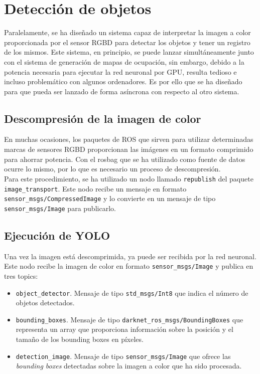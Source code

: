\section{Detección de objetos}

Paralelamente, se ha diseñado un sistema capaz de interpretar la imagen a color proporcionada por el sensor RGBD para detectar los objetos y tener un registro de los mismos. Este sistema, en principio, se puede lanzar simultáneamente junto con el sistema de generación de mapas de ocupación, sin embargo, debido a la potencia necesaria para ejecutar la red neuronal por GPU, resulta tedioso e incluso problemático con algunos ordenadores. Es por ello que se ha diseñado para que pueda ser lanzado de forma asíncrona con respecto al otro sistema.\\

\subsection{Descompresión de la imagen de color}

En muchas ocasiones, los paquetes de ROS que sirven para utilizar determinadas marcas de sensores RGBD proporcionan las imágenes en un formato comprimido para ahorrar potencia. Con el rosbag que se ha utilizado como fuente de datos ocurre lo mismo, por lo que es necesario un proceso de descompresión.\\

Para este procedimiento, se ha utilizado un nodo llamado \texttt{republish} del paquete \texttt{image\_transport}. Este nodo recibe un mensaje en formato \texttt{sensor\_msgs/\-Compressed\-Image} y lo convierte en un mensaje de tipo \texttt{sensor\_msgs/Image} para publicarlo.\\

\subsection{Ejecución de YOLO}

Una vez la imagen está descomprimida, ya puede ser recibida por la red neuronal. Este nodo recibe la imagen de color en formato \texttt{sensor\_msgs/Image} y publica en tres topics:

\begin{itemize}

	\item \texttt{object\_detector}. Mensaje de tipo \texttt{std\_msgs/Int8} que indica el número de objetos detectados.
	\item \texttt{bounding\_boxes}. Mensaje de tipo \texttt{darknet\_ros\_msgs/BoundingBoxes} que representa un array que proporciona información sobre la posición y el tamaño de los bounding boxes en píxeles.
	\item \texttt{detection\_image}. Mensaje de tipo \texttt{sensor\_msgs/Image} que ofrece las \textit{bounding boxes} detectadas sobre la imagen a color que ha sido procesada.
	
\end{itemize}

